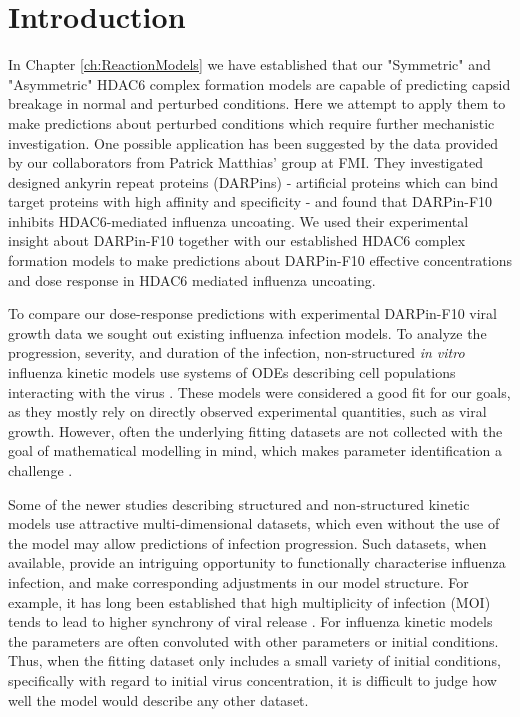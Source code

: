\section{Introduction}


In Chapter \ref{ch:ReactionModels} we have established that our "Symmetric" and "Asymmetric" HDAC6 complex formation models are capable of predicting capsid breakage in normal and perturbed conditions. Here we attempt to apply them to make predictions about perturbed conditions which require further mechanistic investigation. One possible application has been suggested by the data provided by our collaborators from Patrick Matthias' group at FMI. They investigated designed ankyrin repeat proteins (DARPins) - artificial proteins which can bind target proteins with high affinity and specificity - and found that DARPin-F10 inhibits HDAC6-mediated influenza uncoating. We used their experimental insight about DARPin-F10 together with our established HDAC6 complex formation models to make predictions about DARPin-F10 effective concentrations and dose response in HDAC6 mediated influenza uncoating.

To compare our dose-response predictions with experimental DARPin-F10 viral growth data we sought out existing influenza infection models. To analyze the progression, severity, and duration of the infection, non-structured \textit{in vitro} influenza kinetic models use systems of ODEs describing cell populations interacting with the virus \cite{beauchemin2008modeling}. These models were considered a good fit for our goals, as they mostly rely on directly observed experimental quantities, such as viral growth. However, often the underlying fitting datasets are not collected with the goal of mathematical modelling in mind, which makes parameter identification a challenge \cite{boianelli2015modeling}.

Some of the newer studies describing structured and non-structured kinetic models \cite{rudiger2019multiscale, schulze2009infection} use attractive multi-dimensional datasets, which even without the use of the model may allow predictions of infection progression. Such datasets, when available, provide an intriguing opportunity to functionally characterise influenza infection, and make corresponding adjustments in our model structure. For example, it has long been established that high multiplicity of infection (MOI) tends to lead to higher synchrony of viral release \cite{cairns1957asynchrony}. For influenza kinetic models the parameters are often convoluted with other parameters or initial conditions. Thus, when the fitting dataset only includes a small variety of initial conditions, specifically with regard to initial virus concentration, it is difficult to judge how well the model would describe any other dataset.

